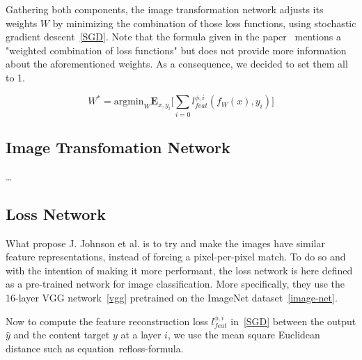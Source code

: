 \documentclass{article}
\begin{document}
{        \bigskip
        
        Gathering both components, the image transformation network adjusts its weights $W$ by minimizing the combination of those loss functions, using stochastic gradient descent~\ref{SGD}. Note that the formula given in the paper~\cite{https://doi.org/10.48550/arxiv.1603.08155} mentions a "weighted combination of loss functions" but does not provide more information about the aforementioned weights. As a consequence, we decided to set them all to 1.

        \begin{equation}
            W^* = 
                \text{argmin}_W \textbf{E}_{x,y_i}
                \biggl[
                    \sum_{i=0} l^{\phi, i}_{feat}(f_W(x), y_i)
                \biggr]
            \label{SGD}
        \end{equation}


        \subsection{Image Transfomation Network}
        \label{subsec:image-transform-net}


        …


        \subsection{Loss Network}
        \label{subsec:loss-net}

        What propose J. Johnson et al. is to try and make the images have similar feature representations, instead of forcing a pixel-per-pixel match. To do so and with the intention of making it more performant, the loss network is here defined as a pre-trained network for image classification. More specifically, they use the 16-layer VGG network~\ref{vgg} pretrained on the ImageNet dataset~\ref{image-net}. 

        Now to compute the feature reconstruction loss $l^{\phi, i}_{feat}$ in~\ref{SGD} between the output $\hat y$ and the content target $y$ at a layer $i$, we use the mean square Euclidean distance such as equation~ref{loss-formula}.

}
\end{document}
